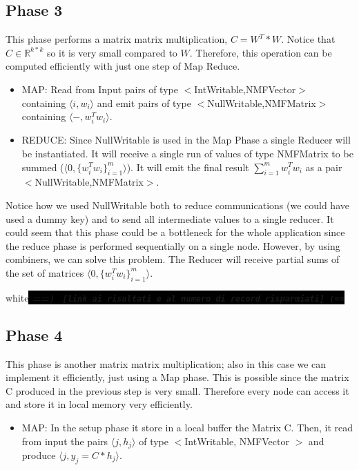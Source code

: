 \documentclass[a4paper,12pt]{article}
\newcommand{\commento}[1]{\begin{color}{white}\colorbox{black}{
	\textit{\textbf{==) \texttt{ [#1] (==}}}}\end{color}
}
\begin{document}
\subsection{Phase 3}
\label{sec:phase3}

This phase performs a matrix matrix multiplication, $C=W^T*W$.
Notice that $C \in \mathbb{R}^{k*k}$ so it is very small compared to $W$.
Therefore, this operation can be computed efficiently with just one step of Map Reduce.

       \begin{itemize}

         \item MAP: Read from Input pairs of type $<$IntWritable,NMFVector$>$ containing $\langle i, w_i \rangle$ and emit pairs of type $<$NullWritable,NMFMatrix$>$ containing  $\langle -,w_i^T w_i \rangle$.

          \item REDUCE: Since NullWritable is used in the Map Phase a single Reducer will be instantiated. It will receive a single run of values of type NMFMatrix to be summed ($\langle 0,\{w_i^T w_i\}_{i=1}^{m} \rangle $). It will emit the final result $\sum_{i=1}^{m} w_i^T w_i$ as a pair $<$NullWritable,NMFMatrix$>$.

       \end{itemize}
Notice how we used NullWritable both to reduce communications (we could have used a dummy key) and to send all intermediate values to a single reducer.
It could seem that this phase could be a bottleneck for the whole application since the reduce phase is performed sequentially on a single node.
However, by using combiners, we can solve this problem.
The Reducer will receive partial sums of the set of matrices $\langle 0,\{w_i^T w_i\}_{i=1}^{m} \rangle $.
\commento{link ai risultati e al numero di record risparmiati}

\subsection{Phase 4}
\label{sec:phase4}

This phase is another matrix matrix multiplication; also in this case we can implement it efficiently, just using a Map phase.
This is possible since the matrix C produced in the previous step is very small.
Therefore every node can access it and store it in local memory very efficiently.

\begin{itemize}

         \item MAP: In the setup phase it store in a local buffer the Matrix C.
         			Then, it read from input the pairs $ \langle j, h_j \rangle$ of type $<$IntWritable, NMFVector $>$ and produce $ \langle j, y_j = C*h_j \rangle$.

\end{itemize}
\end{document}
